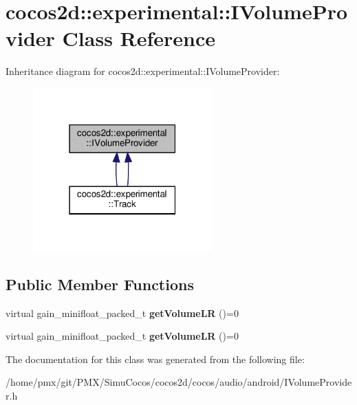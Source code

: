 \hypertarget{classcocos2d_1_1experimental_1_1IVolumeProvider}{}\section{cocos2d\+:\+:experimental\+:\+:I\+Volume\+Provider Class Reference}
\label{classcocos2d_1_1experimental_1_1IVolumeProvider}


Inheritance diagram for cocos2d\+:\+:experimental\+:\+:I\+Volume\+Provider\+:
\nopagebreak
\begin{figure}[H]
\begin{center}
\leavevmode
\includegraphics[width=195pt]{classcocos2d_1_1experimental_1_1IVolumeProvider__inherit__graph}
\end{center}
\end{figure}
\subsection*{Public Member Functions}
\begin{DoxyCompactItemize}
\item 
\mbox{\label{classcocos2d_1_1experimental_1_1IVolumeProvider_a30a9e179ce8a9bc9ef00955aee091240}} 
virtual gain\+\_\+minifloat\+\_\+packed\+\_\+t {\bfseries get\+Volume\+LR} ()=0
\item 
\mbox{\label{classcocos2d_1_1experimental_1_1IVolumeProvider_a30a9e179ce8a9bc9ef00955aee091240}} 
virtual gain\+\_\+minifloat\+\_\+packed\+\_\+t {\bfseries get\+Volume\+LR} ()=0
\end{DoxyCompactItemize}


The documentation for this class was generated from the following file\+:\begin{DoxyCompactItemize}
\item 
/home/pmx/git/\+P\+M\+X/\+Simu\+Cocos/cocos2d/cocos/audio/android/I\+Volume\+Provider.\+h\end{DoxyCompactItemize}
